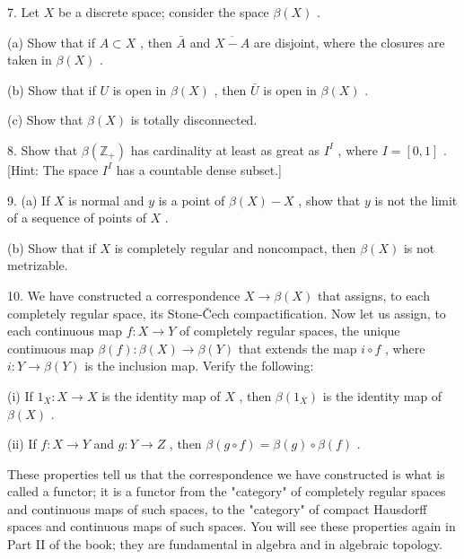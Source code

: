 \documentclass[10pt]{article}
\begin{document}
7. Let \(X\) be a discrete space; consider the space \(\beta \left( X\right)\) .

(a) Show that if \(A \subset  X\) , then \(\bar{A}\) and \(\overline{X - A}\) are disjoint, where the closures are taken in \(\beta \left( X\right)\) .

(b) Show that if \(U\) is open in \(\beta \left( X\right)\) , then \(\bar{U}\) is open in \(\beta \left( X\right)\) .

(c) Show that \(\beta \left( X\right)\) is totally disconnected.

8. Show that \(\beta \left( {\mathbb{Z}}_{ + }\right)\) has cardinality at least as great as \({I}^{I}\) , where \(I = \left\lbrack  {0,1}\right\rbrack\) . [Hint: The space \({I}^{I}\) has a countable dense subset.]

9. (a) If \(X\) is normal and \(y\) is a point of \(\beta \left( X\right)  - X\) , show that \(y\) is not the limit of a sequence of points of \(X\) .

(b) Show that if \(X\) is completely regular and noncompact, then \(\beta \left( X\right)\) is not metrizable.

10. We have constructed a correspondence \(X \rightarrow  \beta \left( X\right)\) that assigns, to each completely regular space, its Stone-Čech compactification. Now let us assign, to each continuous map \(f : X \rightarrow  Y\) of completely regular spaces, the unique continuous map \(\beta \left( f\right)  : \beta \left( X\right)  \rightarrow  \beta \left( Y\right)\) that extends the map \(i \circ  f\) , where \(i : Y \rightarrow  \beta \left( Y\right)\) is the inclusion map. Verify the following:

(i) If \({1}_{X} : X \rightarrow  X\) is the identity map of \(X\) , then \(\beta \left( {1}_{X}\right)\) is the identity map of \(\beta \left( X\right)\) .

(ii) If \(f : X \rightarrow  Y\) and \(g : Y \rightarrow  Z\) , then \(\beta \left( {g \circ  f}\right)  = \beta \left( g\right)  \circ  \beta \left( f\right)\) .

These properties tell us that the correspondence we have constructed is what is called a functor; it is a functor from the "category" of completely regular spaces and continuous maps of such spaces, to the "category" of compact Hausdorff spaces and continuous maps of such spaces. You will see these properties again in Part II of the book; they are fundamental in algebra and in algebraic topology.
\end{document}
